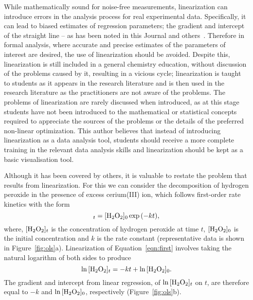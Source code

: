 \documentclass[journal=jceda8,manuscript=article]{achemso}
\begin{document}
While mathematically sound for noise-free measurements, linearization can introduce errors in the analysis process for real experimental data. 
Specifically, it can lead to biased estimates of regression parameters; the gradient and intercept of the straight line -- as has been noted in this Journal and others~\cite{delevie_when_1986,rusling_minimizing_1988,zielinski_least_1997,denton_analysis_2000,levent_dont_2004,rittenhouse_chapter_2005,perrin_linear_2017,moeglich_open_2018,alamillo_mechanistic_2022}.
Therefore in formal analysis, where accurate and precise estimates of the parameters of interest are desired, the use of linearization should be avoided. 
Despite this, linearization is still included in a general chemistry education, without discussion of the problems caused by it, resulting in a vicious cycle; linearization is taught to students as it appears in the research literature and is then used in the research literature as the practitioners are not aware of the problems. 
The problems of linearization are rarely discussed when introduced, as at this stage students have not been introduced to the mathematical or statistical concepts required to appreciate the sources of the problems or the details of the preferred non-linear optimization.
This author believes that instead of introducing linearization as a data analysis tool, students should receive a more complete training in the relevant data analysis skills and linearization should be kept as a basic visualisation tool.

Although it has been covered by others, it is valuable to restate the problem that results from linearization.
For this we can consider the decomposition of hydrogen peroxide  in the presence of excess cerium(III) ion, which follows first-order rate kinetics with the form~\cite{monk_math_2010}
%
\begin{equation}
    [\ce{H2O2}]_t = [\ce{H2O2}]_0\exp{(-kt)},
    \label{eqn:first}
\end{equation}
%
where, $[\ce{H2O2}]_t$ is the concentration of hydrogen peroxide at time $t$, $[\ce{H2O2}]_0$ is the initial concentration and $k$ is the rate constant (representative data is shown in Figure~\ref{fig:ols}a).
Linearization of Equation~\ref{eqn:first} involves taking the natural logarithm of both sides to produce
%
\begin{equation}
    \ln{[\ce{H2O2}]_t} = -kt + \ln{[\ce{H2O2}]_0}.
    \label{eqn:log}
\end{equation}
%
The gradient and intercept from linear regression, of $\ln{[\ce{H2O2}]_t}$ on $t$, are therefore equal to $-k$ and $\ln{[\ce{H2O2}]_0}$, respectively (Figure~\ref{fig:ols}b).
\end{document}
